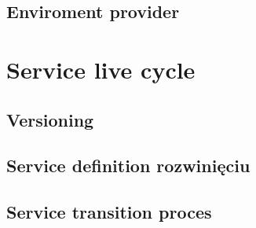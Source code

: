 \documentclass[a4paper,10pt]{article}
\begin{document}
\subsection{Enviroment provider}

\section{Service live cycle}
\subsection{Versioning}
\subsection{Service definition rozwinięciu}
\subsection{Service transition proces}



% 
% 
\end{document}

